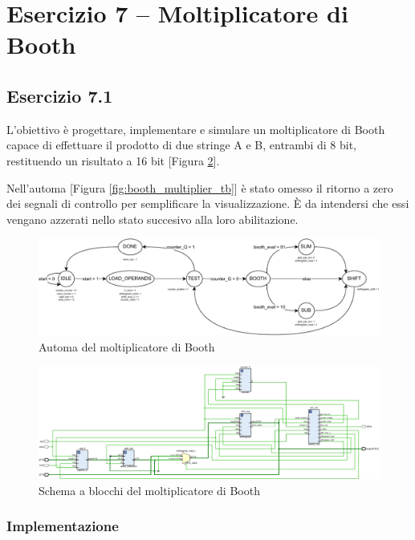 \section{Esercizio 7 -- Moltiplicatore di Booth}
\subsection{Esercizio 7.1}
L'obiettivo è progettare, implementare e simulare un moltiplicatore di Booth capace di effettuare il prodotto di due stringe A e B, entrambi di 8 bit, restituendo un risultato a 16 bit [Figura \ref{fig:7_1_BOOTH_MULTIPLIER}].

Nell'automa [Figura \ref{fig:booth_multiplier_tb}] è stato omesso il ritorno a zero dei segnali di controllo per semplificare la visualizzazione. È da intendersi che essi vengano azzerati nello stato succesivo alla loro abilitazione.

\begin{figure}[h]
    \centering
    \includegraphics[width=\linewidth]{img/booth_multiplier.pdf}
    \caption{Automa del moltiplicatore di Booth}
    \label{fig:booth_multiplier}
\end{figure}

\begin{figure}[h]
    \centering
    \includegraphics[width=\linewidth]{img/7_1_BOOTH_MULTIPLIER.pdf}
    \caption{Schema a blocchi del moltiplicatore di Booth}
    \label{fig:7_1_BOOTH_MULTIPLIER}
\end{figure}

\subsubsection{Implementazione}

